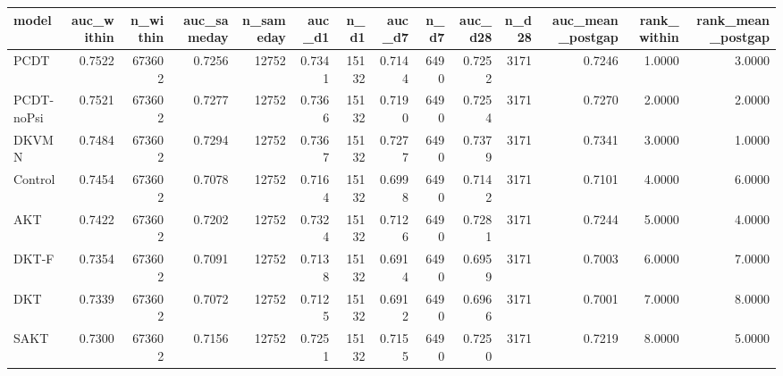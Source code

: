 \begin{tabular}{lrrrrrrrrrrrrr}
\toprule
model & auc\_within & n\_within & auc\_sameday & n\_sameday & auc\_d1 & n\_d1 & auc\_d7 & n\_d7 & auc\_d28 & n\_d28 & auc\_mean\_postgap & rank\_within & rank\_mean\_postgap \\
\midrule
PCDT & 0.7522 & 673602 & 0.7256 & 12752 & 0.7341 & 15132 & 0.7144 & 6490 & 0.7252 & 3171 & 0.7246 & 1.0000 & 3.0000 \\
PCDT-noPsi & 0.7521 & 673602 & 0.7277 & 12752 & 0.7366 & 15132 & 0.7190 & 6490 & 0.7254 & 3171 & 0.7270 & 2.0000 & 2.0000 \\
DKVMN & 0.7484 & 673602 & 0.7294 & 12752 & 0.7367 & 15132 & 0.7277 & 6490 & 0.7379 & 3171 & 0.7341 & 3.0000 & 1.0000 \\
Control & 0.7454 & 673602 & 0.7078 & 12752 & 0.7164 & 15132 & 0.6998 & 6490 & 0.7142 & 3171 & 0.7101 & 4.0000 & 6.0000 \\
AKT & 0.7422 & 673602 & 0.7202 & 12752 & 0.7324 & 15132 & 0.7126 & 6490 & 0.7281 & 3171 & 0.7244 & 5.0000 & 4.0000 \\
DKT-F & 0.7354 & 673602 & 0.7091 & 12752 & 0.7138 & 15132 & 0.6914 & 6490 & 0.6959 & 3171 & 0.7003 & 6.0000 & 7.0000 \\
DKT & 0.7339 & 673602 & 0.7072 & 12752 & 0.7125 & 15132 & 0.6912 & 6490 & 0.6966 & 3171 & 0.7001 & 7.0000 & 8.0000 \\
SAKT & 0.7300 & 673602 & 0.7156 & 12752 & 0.7251 & 15132 & 0.7155 & 6490 & 0.7250 & 3171 & 0.7219 & 8.0000 & 5.0000 \\
\bottomrule
\end{tabular}
